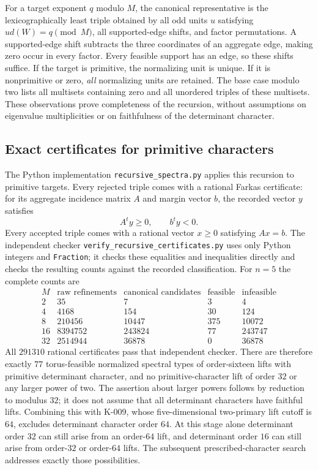 For a target exponent $q$ modulo $M$, the canonical representative is the
lexicographically least triple obtained by all odd units $u$ satisfying
$u d(W)=q\pmod M$, all supported-edge shifts, and factor permutations.
A supported-edge shift subtracts the three coordinates of an aggregate
edge, making zero occur in every factor.  Every feasible support has an
edge, so these shifts suffice.  If the target is primitive, the normalizing
unit is unique.  If it is nonprimitive or zero, \emph{all} normalizing
units are retained.  The base case modulo two lists all multisets
containing zero and all unordered triples of these multisets.  These
observations prove completeness of the recursion, without assumptions
on eigenvalue multiplicities or on faithfulness of the determinant
character.

\subsection*{Exact certificates for primitive characters}
The Python implementation \texttt{recursive\_spectra.py} applies this
recursion to primitive targets.  Every rejected triple comes with a
rational Farkas certificate: for its aggregate incidence matrix $A$ and
margin vector $b$, the recorded vector $y$ satisfies
\[
                       A^t y\ge0,\qquad b^t y<0.
\]
Every accepted triple comes with a rational vector $x\ge0$ satisfying
$Ax=b$.  The independent checker
\texttt{verify\_recursive\_certificates.py} uses only Python integers and
\texttt{Fraction}; it checks these equalities and inequalities directly
and checks the resulting counts against the recorded classification.
For $n=5$ the complete counts are
\[
\begin{array}{c|r|r|r|r}
 M&\text{raw refinements}&\text{canonical candidates}&
    \text{feasible}&\text{infeasible}\\\hline
 2&35&7&3&4\\
 4&4168&154&30&124\\
 8&210456&10447&375&10072\\
 16&8394752&243824&77&243747\\
 32&2514944&36878&0&36878
\end{array}                                                    \tag{K-010a}
\]
All $291310$ rational certificates pass that independent checker.
There are therefore exactly $77$ torus-feasible normalized spectral
types of order-sixteen lifts with primitive determinant character,
and no primitive-character lift of order $32$ or any larger power of
two.  The assertion about larger powers follows by reduction to modulus
$32$; it does not assume that all determinant characters have faithful
lifts.  Combining this with K-009, whose five-dimensional two-primary
lift cutoff is $64$, excludes determinant character order $64$.
At this stage alone determinant order $32$ can still arise from an
order-$64$ lift, and determinant order $16$ can still arise from
order-$32$ or order-$64$ lifts.  The subsequent prescribed-character
search addresses exactly those possibilities.

